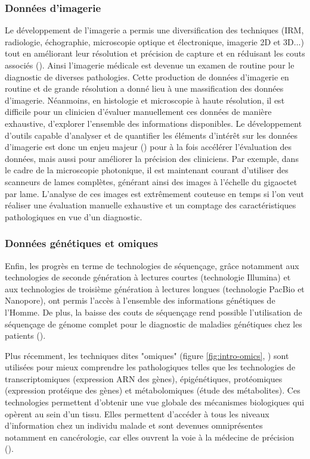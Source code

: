 \subsubsection{Données d'imagerie}
Le développement de l'imagerie a permis une diversification des techniques (IRM, radiologie, échographie, microscopie optique et électronique, imagerie 2D et 3D...) tout en améliorant leur résolution et précision de capture et en réduisant les couts associés (\cite{abdallah_history_2017, prakash_super-resolution_2022, sheppard_structured_2021}). Ainsi l'imagerie médicale est devenue un examen de routine pour le diagnostic de diverses pathologies. Cette production de données d'imagerie en routine et de grande résolution a donné lieu à une massification des données d'imagerie. Néanmoins, en histologie et microscopie à haute résolution, il est difficile pour un clinicien d'évaluer manuellement ces données de manière exhaustive, d'explorer l'ensemble des informations disponibles. Le développement d'outils capable d'analyser et de quantifier les éléments d'intérêt sur les données d'imagerie est donc un enjeu majeur (\cite{tchito_tchapga_biomedical_2021}) pour à la fois accélérer l'évaluation des données, mais aussi pour améliorer la précision des cliniciens. Par exemple, dans le cadre de la microscopie photonique, il est maintenant courant d'utiliser des scanneurs de lames complètes, générant ainsi des images à l'échelle du gigaoctet par lame. L'analyse de ces images est extrêmement couteuse en temps si l’on veut réaliser une évaluation manuelle exhaustive et un comptage des caractéristiques pathologiques en vue d'un diagnostic.

\subsubsection{Données génétiques et omiques}
Enfin, les progrès en terme de technologies de séquençage, grâce notamment aux technologies de seconde génération à lectures courtes (technologie Illumina) et aux technologies de troisième génération à lectures longues (technologie PacBio et Nanopore), ont permis l'accès à l'ensemble des informations génétiques de l'Homme. De plus, la baisse des couts de séquençage rend possible l'utilisation de séquençage de génome complet pour le diagnostic de maladies génétiques chez les patients (\cite{rabbani_next-generation_2012}). 

Plus récemment, les techniques dites "omiques" (figure \ref{fig:intro-omics}, \cite{momeni_survey_2020}) sont utilisées pour mieux comprendre les pathologiques telles que les technologies de transcriptomiques (expression ARN des gènes), épigénétiques, protéomiques (expression protéique des gènes) et métabolomiques (étude des métabolites). Ces technologies permettent d'obtenir une vue globale des mécanismes biologiques qui opèrent au sein d'un tissu. Elles permettent d'accéder à tous les niveaux d'information chez un individu malade et sont devenues omniprésentes notamment en cancérologie, car elles ouvrent la voie à la médecine de précision (\cite{chen_promise_2013, dai_advances_2022, raufaste-cazavieille_multi-omics_2022}).

